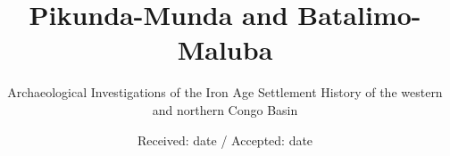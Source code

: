 \documentclass[smallextended,natbib]{svjour3}       %
\begin{document}
	
\title{Pikunda-Munda and Batalimo-Maluba}
\subtitle{Archaeological Investigations of the Iron Age Settlement History of the western and northern Congo Basin}

\author{}


\date{Received: date / Accepted: date}

\maketitle
\end{document}

